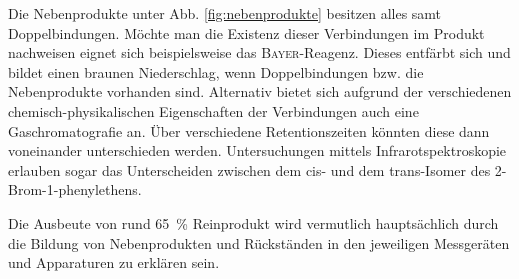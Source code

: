 Die Nebenprodukte unter Abb. \ref{fig:nebenprodukte} besitzen alles samt Doppelbindungen. Möchte man die Existenz dieser Verbindungen im Produkt nachweisen eignet sich beispielsweise das \textsc{Bayer}-Reagenz. Dieses entfärbt sich und bildet einen braunen Niederschlag, wenn Doppelbindungen bzw. die Nebenprodukte vorhanden sind. Alternativ bietet sich aufgrund der verschiedenen chemisch-physikalischen Eigenschaften der Verbindungen auch eine Gaschromatografie an. Über verschiedene Retentionszeiten könnten diese dann voneinander unterschieden werden. Untersuchungen mittels Infrarotspektroskopie erlauben sogar das Unterscheiden zwischen dem cis- und dem trans-Isomer des 2-Brom-1-phenylethens.

Die Ausbeute von rund \SI{65}{\percent} Reinprodukt wird vermutlich hauptsächlich durch die Bildung von Nebenprodukten und Rückständen in den jeweiligen Messgeräten und Apparaturen zu erklären sein. 